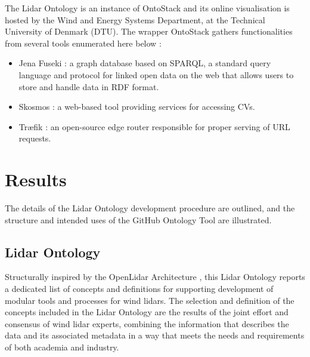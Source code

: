 \documentclass[remotesensing,article,submit,pdftex,moreauthors]{Definitions/mdpi}
\begin{document}
\begin{description}
    The Lidar Ontology is an instance of OntoStack and its online visualisation is hosted by the Wind and Energy Systems Department, at the Technical University of Denmark (DTU).
    The wrapper OntoStack gathers functionalities from several tools enumerated here below \cite{ref-github-sheet2rdf}:
    \begin{itemize}
        \item Jena Fuseki \cite{ref-JenaFuseki}: a graph database based on SPARQL, a standard query language and protocol for linked open data on the web \cite{ref-SPARQL} that allows users to store and handle data in RDF format.
        \item Skosmos \cite{ref-Skosmos}: a web-based tool providing services for accessing CVs.
        \item Tr\ae fik \cite{ref-Traefik}: an open-source edge router responsible for proper serving of URL requests. 
    \end{itemize}
\end{description}


\section{Results}
\label{sec:Results}
The details of the Lidar Ontology development procedure are outlined, and the structure and intended uses of the GitHub Ontology Tool are illustrated.

\subsection{Lidar Ontology}
Structurally inspired by the OpenLidar Architecture \cite{clifton_andrew_2019_3414197}, this Lidar Ontology reports a dedicated list of concepts and definitions for supporting development of modular tools and processes for wind lidars. The selection and definition of the concepts included in the Lidar Ontology are the results of the joint effort and consensus of wind lidar experts, combining the information that describes the data and its associated metadata in a way that meets the needs and requirements of both academia and industry.

\end{document}
